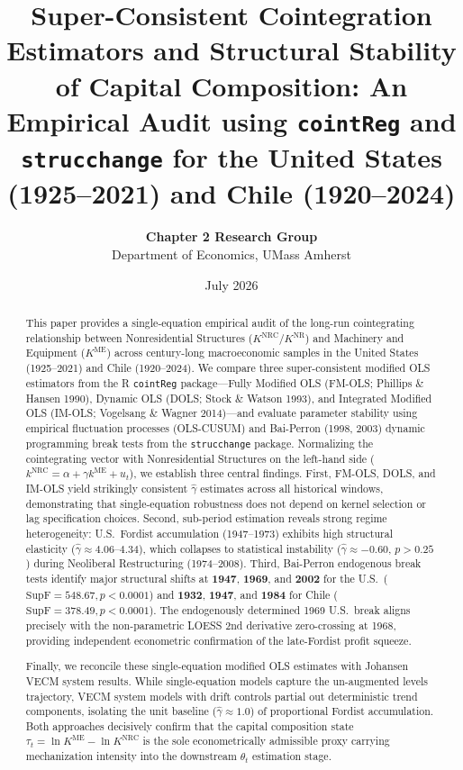 \documentclass[11pt,a4paper]{article}
\title{\textbf{Super-Consistent Cointegration Estimators and Structural Stability of Capital Composition: An Empirical Audit using \texttt{cointReg} and \texttt{strucchange} for the United States (1925--2021) and Chile (1920--2024)}}
\author{\textbf{Chapter 2 Research Group} \\ Department of Economics, UMass Amherst}
\date{July 2026}
\begin{document}
\maketitle

\begin{abstract}
This paper provides a single-equation empirical audit of the long-run cointegrating relationship between Nonresidential Structures ($K^{\text{NRC}}$/$K^{\text{NR}}$) and Machinery and Equipment ($K^{\text{ME}}$) across century-long macroeconomic samples in the United States (1925--2021) and Chile (1920--2024). We compare three super-consistent modified OLS estimators from the R \texttt{cointReg} package---Fully Modified OLS (FM-OLS; Phillips \& Hansen 1990), Dynamic OLS (DOLS; Stock \& Watson 1993), and Integrated Modified OLS (IM-OLS; Vogelsang \& Wagner 2014)---and evaluate parameter stability using empirical fluctuation processes (OLS-CUSUM) and Bai-Perron (1998, 2003) dynamic programming break tests from the \texttt{strucchange} package. Normalizing the cointegrating vector with Nonresidential Structures on the left-hand side ($k^{\text{NRC}} = \alpha + \gamma k^{\text{ME}} + u_t$), we establish three central findings. First, FM-OLS, DOLS, and IM-OLS yield strikingly consistent $\hat{\gamma}$ estimates across all historical windows, demonstrating that single-equation robustness does not depend on kernel selection or lag specification choices. Second, sub-period estimation reveals strong regime heterogeneity: U.S.\ Fordist accumulation (1947--1973) exhibits high structural elasticity ($\hat{\gamma} \approx 4.06$--$4.34$), which collapses to statistical instability ($\hat{\gamma} \approx -0.60$, $p > 0.25$) during Neoliberal Restructuring (1974--2008). Third, Bai-Perron endogenous break tests identify major structural shifts at \textbf{1947}, \textbf{1969}, and \textbf{2002} for the U.S.\ ($\text{SupF} = 548.67, p < 0.0001$) and \textbf{1932}, \textbf{1947}, and \textbf{1984} for Chile ($\text{SupF} = 378.49, p < 0.0001$). The endogenously determined 1969 U.S.\ break aligns precisely with the non-parametric LOESS 2nd derivative zero-crossing at 1968, providing independent econometric confirmation of the late-Fordist profit squeeze.

Finally, we reconcile these single-equation modified OLS estimates with Johansen VECM system results. While single-equation models capture the un-augmented levels trajectory, VECM system models with drift controls partial out deterministic trend components, isolating the unit baseline ($\hat{\gamma} \approx 1.0$) of proportional Fordist accumulation. Both approaches decisively confirm that the capital composition state $\tau_t = \ln K^{\text{ME}} - \ln K^{\text{NRC}}$ is the sole econometrically admissible proxy carrying mechanization intensity into the downstream $\theta_t$ estimation stage.
\end{abstract}
\end{document}
